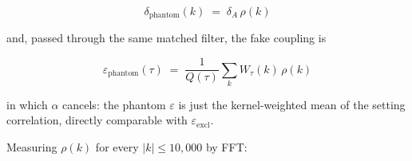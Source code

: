 \documentclass[
  11pt,
]{article}
\begin{document}
\begin{equation}
\delta_{\mathrm{phantom}}(k) \;=\; \delta_A\,\rho(k)
\label{eq:phantom}
\end{equation}

and, passed through the same matched filter, the fake coupling is

\begin{equation}
\varepsilon_{\mathrm{phantom}}(\tau) \;=\; \frac{1}{Q(\tau)}\sum_k W_\tau(k)\,\rho(k)
\label{eq:phantom-eps}
\end{equation}

in which \(\alpha\) cancels: the phantom \(\varepsilon\) is just the
kernel-weighted mean of the setting correlation, directly comparable
with \(\varepsilon_{\mathrm{excl}}\).

Measuring \(\rho(k)\) for every \(|k| \le 10{,}000\) by FFT:
\end{document}
